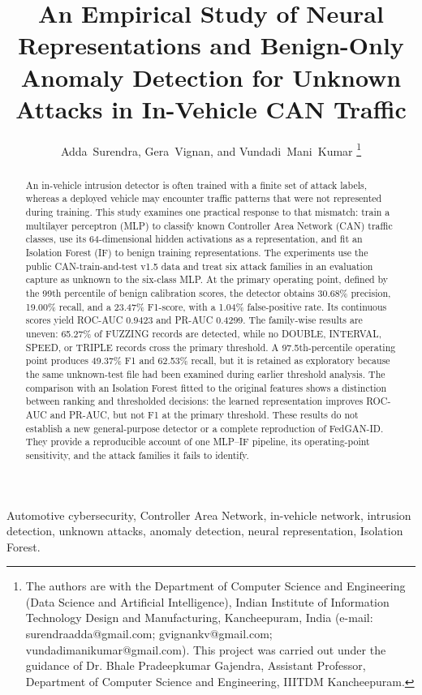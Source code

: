 \documentclass[journal]{IEEEtran}
\title{An Empirical Study of Neural Representations and Benign-Only Anomaly Detection for Unknown Attacks in In-Vehicle CAN Traffic}
\author{Adda~Surendra, Gera~Vignan, and Vundadi~Mani~Kumar%
\thanks{The authors are with the Department of Computer Science and Engineering (Data Science and Artificial Intelligence), Indian Institute of Information Technology Design and Manufacturing, Kancheepuram, India (e-mail: surendraadda@gmail.com; gvignankv@gmail.com; vundadimanikumar@gmail.com). This project was carried out under the guidance of Dr. Bhale Pradeepkumar Gajendra, Assistant Professor, Department of Computer Science and Engineering, IIITDM Kancheepuram.}}
\begin{document}
\maketitle

\begin{abstract}
An in-vehicle intrusion detector is often trained with a finite set of attack labels, whereas a deployed vehicle may encounter traffic patterns that were not represented during training. This study examines one practical response to that mismatch: train a multilayer perceptron (MLP) to classify known Controller Area Network (CAN) traffic classes, use its 64-dimensional hidden activations as a representation, and fit an Isolation Forest (IF) to benign training representations. The experiments use the public CAN-train-and-test v1.5 data and treat six attack families in an evaluation capture as unknown to the six-class MLP. At the primary operating point, defined by the 99th percentile of benign calibration scores, the detector obtains 30.68\% precision, 19.00\% recall, and a 23.47\% F1-score, with a 1.04\% false-positive rate. Its continuous scores yield ROC-AUC 0.9423 and PR-AUC 0.4299. The family-wise results are uneven: 65.27\% of FUZZING records are detected, while no DOUBLE, INTERVAL, SPEED, or TRIPLE records cross the primary threshold. A 97.5th-percentile operating point produces 49.37\% F1 and 62.53\% recall, but it is retained as exploratory because the same unknown-test file had been examined during earlier threshold analysis. The comparison with an Isolation Forest fitted to the original features shows a distinction between ranking and thresholded decisions: the learned representation improves ROC-AUC and PR-AUC, but not F1 at the primary threshold. These results do not establish a new general-purpose detector or a complete reproduction of FedGAN-ID. They provide a reproducible account of one MLP--IF pipeline, its operating-point sensitivity, and the attack families it fails to identify.
\end{abstract}

\begin{IEEEkeywords}
Automotive cybersecurity, Controller Area Network, in-vehicle network, intrusion detection, unknown attacks, anomaly detection, neural representation, Isolation Forest.
\end{IEEEkeywords}
\end{document}
